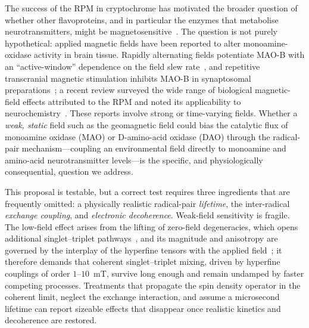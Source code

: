 \documentclass[twoside,twocolumn,9pt]{article}
\begin{document}
The success of the RPM in cryptochrome has motivated the broader question of
whether other flavoproteins, and in particular the enzymes that metabolise
neurotransmitters, might be magnetosensitive~\cite{Jones2009,ZadehHaghighi2022}.
The question is not purely hypothetical: applied magnetic fields have been
reported to alter monoamine-oxidase activity in brain tissue. Rapidly
alternating fields potentiate MAO-B with an ``active-window'' dependence on the
field slew rate~\cite{Yokoi2000}, and repetitive transcranial magnetic
stimulation inhibits MAO-B in synaptosomal preparations~\cite{Kaczmarczyk2018};
a recent review surveyed the wide range of biological magnetic-field effects
attributed to the RPM and noted its applicability to
neurochemistry~\cite{ZadehHaghighi2022}. These reports involve strong or
time-varying fields. Whether a \emph{weak, static} field such as the geomagnetic
field could bias the catalytic flux of monoamine oxidase (MAO) or D-amino-acid
oxidase (DAO) through the radical-pair mechanism---coupling an environmental
field directly to monoamine and amino-acid neurotransmitter levels---is the
specific, and physiologically consequential, question we address.

This proposal is testable, but a correct test requires three ingredients that
are frequently omitted: a physically realistic radical-pair \emph{lifetime}, the
inter-radical \emph{exchange coupling}, and \emph{electronic decoherence}.
Weak-field sensitivity is fragile. The low-field effect arises from the lifting
of zero-field degeneracies, which opens additional singlet--triplet
pathways~\cite{Lewis2018}, and its magnitude and anisotropy are governed by the
interplay of the hyperfine tensors with the applied field~\cite{Luo2023}; it
therefore demands that coherent singlet--triplet mixing, driven by hyperfine
couplings of order $1$--$10$~mT, survive long enough and remain undamped by
faster competing processes. Treatments that propagate the spin density operator
in the coherent limit, neglect the exchange interaction, and assume a
microsecond lifetime can report sizeable effects that disappear once realistic
kinetics and decoherence are restored.
\end{document}
